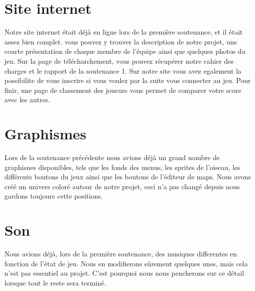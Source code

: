\documentclass [11pt]{report}
\begin{document}
		\vspace{10mm}
		
		
	\section{Site internet}
	
	\vspace{5mm}
	
		Notre site internet était déj\`a en ligne lors de la premi\`ere soutenance, et il était assez bien complet. vous pouvez y trouver la description de notre projet, une courte  présentation de chaque membre de l'équipe ainsi que quelques photos du jeu. Sur la page de télécharchement, vous pouvez récupérer notre cahier des charges et le rapport de la soutenance 1. Sur notre site vous avez egalement la possibilite de vous inscrire si vous voulez par la suite vous connecter au jeu. Pour finir, une page de classement des joueurs vous permet de comparer votre score avec les autres. 
		
		\vspace{15mm}
		
	\section{Graphismes}
	
	\vspace{5mm}
		
		Lors de la soutenance précédente nous avions déj\`a un grand nombre de graphisnes disponibles, tels que les fonds des menus, les sprites de l'oiseau, les différents boutons du jeux ainsi que les boutons de l'éditeur de maps. Nous avons créé un univers coloré autour de notre projet, ceci n'a pas changé depuis nous gardons toujours cette positions.
		
		\vspace{10mm}
		
	\section{Son}
	
	\vspace{3mm}
	
		Nous avions déjà, lors de la première soutenance, des musiques differentes en fonction de l'état de jeu. Nous en modifierons sûrement quelques unes, mais cela n'est pas essentiel au projet. C'est pourquoi nous nous pencherons sur ce détail lorsque tout le reste sera termin\'e.\\
		
\end{document}
